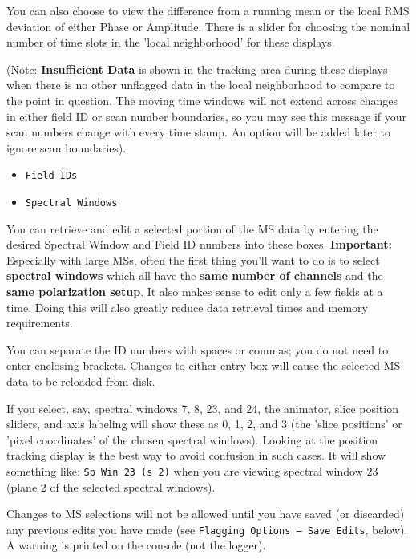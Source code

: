 You can also choose to view the difference from a running mean or the
local RMS deviation of either Phase or Amplitude.  There is a slider
for choosing the nominal number of time slots in the 'local neighborhood'
for these displays.

(Note: {\bf Insufficient Data} is shown in the tracking area during
these displays when there is no other unflagged data in the
local neighborhood to compare to the point in question.  The
moving time windows will not extend across changes in either field ID
or scan number boundaries, so you may see this message if your scan
numbers change with every time stamp.  An option will be added later
to ignore scan boundaries).

\begin{itemize}

\item {\tt Field IDs}

\item {\tt Spectral Windows}

\end{itemize}

You can retrieve and edit a selected portion of the MS data
by entering the desired Spectral Window and Field ID numbers into
these boxes.  {\bf Important:} Especially with large MSs, often the
first thing you'll want to do is to select {\bf spectral windows}
which all have the {\bf same number of channels} and the
{\bf same polarization setup}.  It also makes sense to edit only
a few fields at a time.   Doing this will also
greatly reduce data retrieval times and memory requirements.

You can separate the ID numbers with spaces or commas; you do not need to
enter enclosing brackets.  Changes to either entry box will cause
the selected MS data to be reloaded from disk.

If you select, say, spectral windows 7, 8, 23, and 24, the animator, slice
position sliders, and axis labeling will show 
these as 0, 1, 2, and 3 (the 'slice positions' or 'pixel coordinates' of the
chosen spectral windows).  Looking at the position tracking display is the best
way to avoid confusion in such cases.  It will show something like: 
{\tt Sp Win 23 (s 2)} when you are viewing spectral window 23 (plane 2
of the selected spectral windows).

Changes to MS selections will not be allowed until you have saved
(or discarded) any previous edits you have made (see {\tt Flagging Options 
-- Save Edits}, below).  A warning is printed on the console (not the logger).

